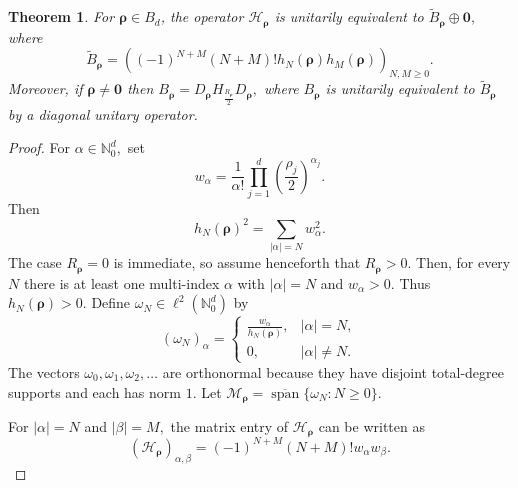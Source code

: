\documentclass[10pt,a4paper]{amsart}
\newtheorem{theorem}{Theorem}
\begin{document}
\begin{theorem}
\label{thm:boundary-Hankel-reduction}
For $\boldsymbol{\rho}\in B_d$, the operator  \(\mathcal{H}_{\boldsymbol{\rho}}\) is unitarily equivalent to $\widetilde{B}_{\boldsymbol{\rho}}\oplus \mathbf{0},$ where
\[
\widetilde{B}_{\boldsymbol{\rho}}
=
\left(
(-1)^{N+M}(N+M)!h_N(\boldsymbol{\rho})h_M(\boldsymbol{\rho})
\right)_{N,M\geq 0}.
\]
Moreover, if $\boldsymbol{\rho}\neq \mathbf{0}$ then
$B_{\boldsymbol{\rho}} =
D_{\boldsymbol{\rho}}H_{\frac{R_{\boldsymbol{\rho}}}{2}}D_{\boldsymbol{\rho}},$
where $B_{\boldsymbol\rho}$ is unitarily equivalent to  $\widetilde B_{\boldsymbol\rho}$ by a diagonal unitary operator.

\end{theorem}

\begin{proof}
For $\alpha\in\mathbb{N}_{0}^{d},$ set
\[
w_{\alpha}
=
\frac{1}{\alpha!}
\prod_{j=1}^{d}
\left(\frac{\rho_j}{2}\right)^{\alpha_j}.
\]
Then
\[
h_N(\boldsymbol{\rho})^{2}
=
\sum_{|\alpha|=N}w_{\alpha}^{2}.
\]
The case  \(R_{\boldsymbol{\rho}}=0\)  is immediate, so assume henceforth that $R_{\boldsymbol{\rho}}>0$. Then,  for every \(N\) there is at least one multi-index \(\alpha\) with $|\alpha|=N$ and $w_{\alpha}>0.$
Thus $h_N(\boldsymbol{\rho})>0.$ Define
$\omega_N\in\ell^{2}(\mathbb{N}_{0}^{d})$ by
\[
(\omega_N)_{\alpha}
=
\begin{cases}
\displaystyle \frac{w_{\alpha}}{h_N(\boldsymbol{\rho})}, & |\alpha|=N,\\[6pt]
0, & |\alpha|\neq N.
\end{cases}
\]
The vectors $\omega_0,\omega_1,\omega_2,\ldots$ are orthonormal because they have disjoint total-degree supports and each has norm \(1\). Let $\mathcal{M}_{\boldsymbol{\rho}}=\overline{\operatorname{span}}\{\omega_N:N\geq 0\}$.

For $|\alpha|=N$ and $|\beta|=M,$ the matrix entry of \(\mathcal{H}_{\boldsymbol{\rho}}\) can be written as
\[
(\mathcal{H}_{\boldsymbol{\rho}})_{\alpha,\beta}
=
(-1)^{N+M}(N+M)!w_{\alpha}w_{\beta}.
\]


\end{proof}
\end{document}
